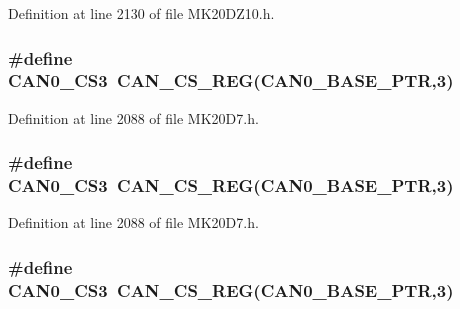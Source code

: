 Definition at line 2130 of file M\+K20\+D\+Z10.\+h.

\subsubsection[{\texorpdfstring{C\+A\+N0\+\_\+\+C\+S3}{CAN0_CS3}}]{\setlength{\rightskip}{0pt plus 5cm}\#define C\+A\+N0\+\_\+\+C\+S3~{\bf C\+A\+N\+\_\+\+C\+S\+\_\+\+R\+EG}({\bf C\+A\+N0\+\_\+\+B\+A\+S\+E\+\_\+\+P\+TR},3)}\hypertarget{group___c_a_n___register___accessor___macros_gae30c041c5e1a95abec6bc35e9d395efd}{}\label{group___c_a_n___register___accessor___macros_gae30c041c5e1a95abec6bc35e9d395efd}


Definition at line 2088 of file M\+K20\+D7.\+h.

\subsubsection[{\texorpdfstring{C\+A\+N0\+\_\+\+C\+S3}{CAN0_CS3}}]{\setlength{\rightskip}{0pt plus 5cm}\#define C\+A\+N0\+\_\+\+C\+S3~{\bf C\+A\+N\+\_\+\+C\+S\+\_\+\+R\+EG}({\bf C\+A\+N0\+\_\+\+B\+A\+S\+E\+\_\+\+P\+TR},3)}\hypertarget{group___c_a_n___register___accessor___macros_gae30c041c5e1a95abec6bc35e9d395efd}{}\label{group___c_a_n___register___accessor___macros_gae30c041c5e1a95abec6bc35e9d395efd}


Definition at line 2088 of file M\+K20\+D7.\+h.

\subsubsection[{\texorpdfstring{C\+A\+N0\+\_\+\+C\+S3}{CAN0_CS3}}]{\setlength{\rightskip}{0pt plus 5cm}\#define C\+A\+N0\+\_\+\+C\+S3~{\bf C\+A\+N\+\_\+\+C\+S\+\_\+\+R\+EG}({\bf C\+A\+N0\+\_\+\+B\+A\+S\+E\+\_\+\+P\+TR},3)}\hypertarget{group___c_a_n___register___accessor___macros_gae30c041c5e1a95abec6bc35e9d395efd}{}\label{group___c_a_n___register___accessor___macros_gae30c041c5e1a95abec6bc35e9d395efd}


